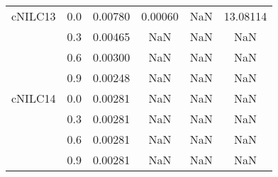 \begin{longtable}{cccccc}
cNILC13 & 0.0 & 0.00780 & 0.00060 & NaN & 13.08114 \\
        & 0.3 & 0.00465 & NaN & NaN & NaN \\
        & 0.6 & 0.00300 & NaN & NaN & NaN \\
        & 0.9 & 0.00248 & NaN & NaN & NaN \\
cNILC14 & 0.0 & 0.00281 & NaN & NaN & NaN \\
        & 0.3 & 0.00281 & NaN & NaN & NaN \\
        & 0.6 & 0.00281 & NaN & NaN & NaN \\
        & 0.9 & 0.00281 & NaN & NaN & NaN \\
\end{longtable}
